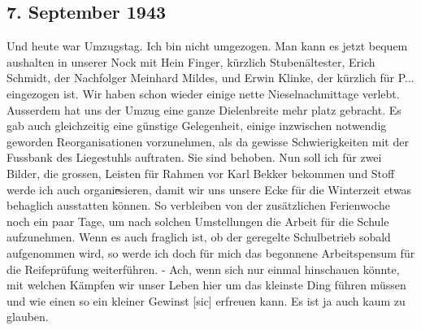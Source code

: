 \subsection{7. September 1943}

Und heute war Umzugstag.
Ich bin nicht umgezogen.
Man kann es jetzt bequem aushalten in unserer Nock mit Hein Finger, k\"{u}rzlich Stuben\"{a}ltester, Erich Schmidt, der Nachfolger Meinhard Mildes, und Erwin Klinke, der k\"{u}rzlich f\"{u}r P... eingezogen ist.
Wir haben schon wieder einige nette Nieselnachmittage verlebt.
Ausserdem hat uns der Umzug eine ganze Dielenbreite mehr platz gebracht.
Es gab auch gleichzeitig eine g\"{u}nstige Gelegenheit, einige inzwischen notwendig geworden Reorganisationen vorzunehmen, als da gewisse Schwierigkeiten mit der Fussbank des Liegestuhls auftraten.
Sie sind behoben.
Nun soll ich f\"{u}r zwei Bilder, die grossen, Leisten f\"{u}r Rahmen vor Karl Bekker bekommen und Stoff werde ich auch organi\st{e}sieren, damit wir uns unsere Ecke f\"{u}r die Winterzeit etwas behaglich ausstatten k\"{o}nnen.
So verbleiben von der zus\"{a}tzlichen Ferienwoche noch ein paar Tage, um nach solchen Umstellungen die Arbeit f\"{u}r die Schule aufzunehmen.
Wenn es auch fraglich ist, ob der geregelte Schulbetrieb sobald aufgenommen wird, so werde ich doch f\"{u}r mich das begonnene Arbeitspensum f\"{u}r die Reifepr\"{u}fung weiterf\"{u}hren.
- Ach, wenn sich nur einmal hinschauen k\"{o}nnte, mit welchen K\"{a}mpfen wir unser Leben hier um das kleinste Ding f\"{u}hren m\"{u}ssen und wie einen so ein kleiner Gewinst{\color{red} [sic] } erfreuen kann. Es ist ja auch kaum zu glauben.

\clearpage
